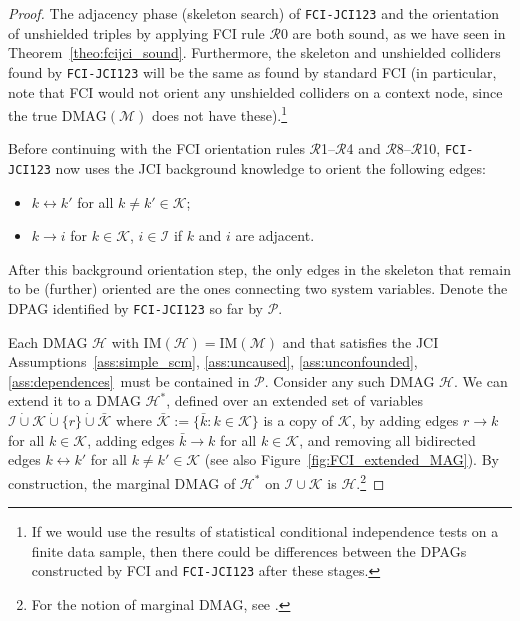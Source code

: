 \documentclass[twoside,11pt]{article}
\newcommand\C[1]{\mathcal{#1}}
\newcommand{\oto}{\leftrightarrow}
\newcommand{\DMAG}{\mathrm{DMAG}}
\newcommand{\IM}{\mathrm{IM}}
\newcommand{\alg}[1]{\texttt{#1}}
\newcommand{\JCIABC}{\ref{ass:uncaused}, \ref{ass:unconfounded}, \ref{ass:dependences}}
\begin{document}
\begin{proof}
  The adjacency phase (skeleton search) of \alg{FCI-JCI123} and the orientation of unshielded triples by applying FCI rule $\C{R}$0 are both sound, as we have seen in Theorem~\ref{theo:fcijci_sound}.
  Furthermore, the skeleton and unshielded colliders found by \alg{FCI-JCI123} will be the same as found by standard FCI (in particular, note that FCI would not orient any unshielded colliders on a context node, since the true $\DMAG(\C{M})$ does not have these).\footnote{If we would use the results of statistical conditional independence tests on a finite data sample, then there could be differences between the DPAGs constructed by FCI and \alg{FCI-JCI123} after these stages.}

  Before continuing with the FCI orientation rules $\C{R}$1--$\C{R}$4 and $\C{R}$8--$\C{R}$10, \alg{FCI-JCI123} now uses the JCI background knowledge to orient the following edges:
  \begin{itemize}
    \item $k \oto k'$ for all $k \ne k' \in \C{K}$;
    \item $k \to i$ for $k \in \C{K}$, $i \in \C{I}$ if $k$ and $i$ are adjacent.
  \end{itemize}
  After this background orientation step, the only edges in the skeleton that remain to be (further) oriented are the ones connecting two system variables. 
  Denote the DPAG identified by \alg{FCI-JCI123} so far by $\C{P}$.

  Each DMAG $\C{H}$ with $\IM(\C{H}) = \IM(\C{M})$ and that satisfies the JCI Assumptions~\ref{ass:simple_scm}, \JCIABC\ must be contained in $\C{P}$.
  Consider any such DMAG $\C{H}$. 
  We can extend it to a DMAG $\C{H}^*$, defined over an extended set of variables $\C{I} \dot\cup \C{K} \dot\cup \{r\} \dot\cup \bar{\C{K}}$ where $\bar{\C{K}} := \{ \bar{k} : k \in \C{K} \}$ is a copy of $\C{K}$, by adding edges $r \to k$ for all $k \in \C{K}$, adding edges $\bar{k} \to k$ for all $k \in \C{K}$, and removing all bidirected edges $k \oto k'$ for all $k \ne k' \in \C{K}$ (see also Figure~\ref{fig:FCI_extended_MAG}).
  By construction, the marginal DMAG of $\C{H}^*$ on $\C{I} \cup \C{K}$ is $\C{H}$.\footnote{For the notion of marginal DMAG, see \citet{RichardsonSpirtes02}.}


\end{proof}
\end{document}

